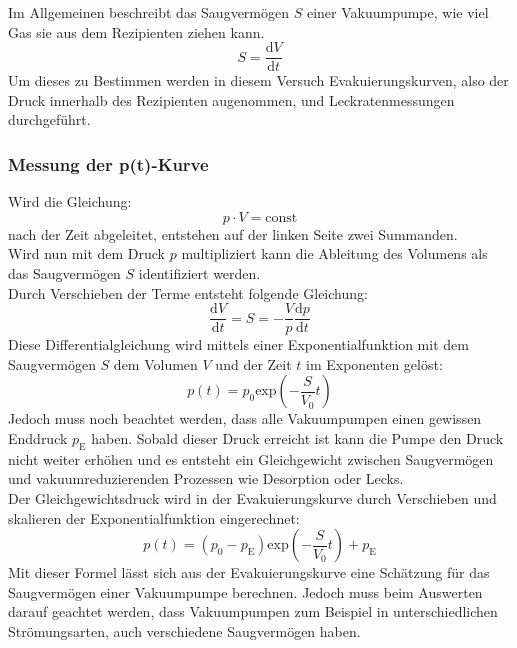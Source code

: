 			\noindent
		Im Allgemeinen beschreibt das Saugvermögen $S$ einer Vakuumpumpe, wie viel Gas sie aus dem Rezipienten ziehen kann. 
		\begin{equation}
			S = \frac{\text{d}V}{\text{d}t}
		\end{equation}
		Um dieses zu Bestimmen werden in diesem Versuch Evakuierungskurven, also der Druck innerhalb des Rezipienten augenommen, und Leckratenmessungen durchgeführt.

		\subsubsection{Messung der p(t)-Kurve}
			
			\noindent
			Wird die Gleichung:
			\begin{equation}
				p \cdot V = \text{const}
			\end{equation}
			nach der Zeit abgeleitet, entstehen auf der linken Seite zwei Summanden. \\
			Wird nun mit dem Druck $p$ multipliziert kann die Ableitung des Volumens als das Saugvermögen $S$ identifiziert werden.\\
			Durch Verschieben der Terme entsteht folgende Gleichung:
			\begin{equation}
				\frac{\text{d}V}{\text{d}t} = S = - \frac{V}{p} \frac{\text{d}p}{\text{d}t}
			\end{equation}
			Diese Differentialgleichung wird mittels einer Exponentialfunktion mit dem Saugvermögen $S$ dem Volumen $V$ und der Zeit $t$ im Exponenten gelöst:
			\begin{equation}
				p(t) = p_0 \text{exp}\left( - \frac{S}{V_0}t \right)
			\end{equation}
			Jedoch muss noch beachtet werden, dass alle Vakuumpumpen einen gewissen Enddruck $p_\text{E}$ haben. 
			Sobald dieser Druck erreicht ist kann die Pumpe den Druck nicht weiter erhöhen und es entsteht ein Gleichgewicht zwischen Saugvermögen und 
			vakuumreduzierenden Prozessen wie Desorption oder Lecks.\\
			Der Gleichgewichtsdruck wird in der Evakuierungskurve durch Verschieben und skalieren der Exponentialfunktion eingerechnet:
			\begin{equation}
				p(t) = (p_0 - p_\text{E}) \text{exp}\left( - \frac{S}{V_0}t \right) + p_\text{E}
			\end{equation}
			Mit dieser Formel lässt sich aus der Evakuierungskurve eine Schätzung für das Saugvermögen einer Vakuumpumpe berechnen.
			Jedoch muss beim Auswerten darauf geachtet werden, dass Vakuumpumpen zum Beispiel in unterschiedlichen Strömungsarten, auch verschiedene Saugvermögen haben.
			
